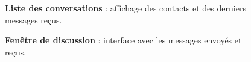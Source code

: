 \documentclass[12pt]{report}
\begin{document}
\begin{figure}[H]
\begin{minipage}[t]{0.45\textwidth}
			\caption*{\textbf{Liste des conversations} : affichage des contacts et des derniers messages reçus.}
		\end{minipage}
		\hfill
		\begin{minipage}[t]{0.45\textwidth}
			\centering
			\caption*{\textbf{Fenêtre de discussion} : interface avec les messages envoyés et reçus.}
		\end{minipage}
	\end{figure}
	
\end{document}
